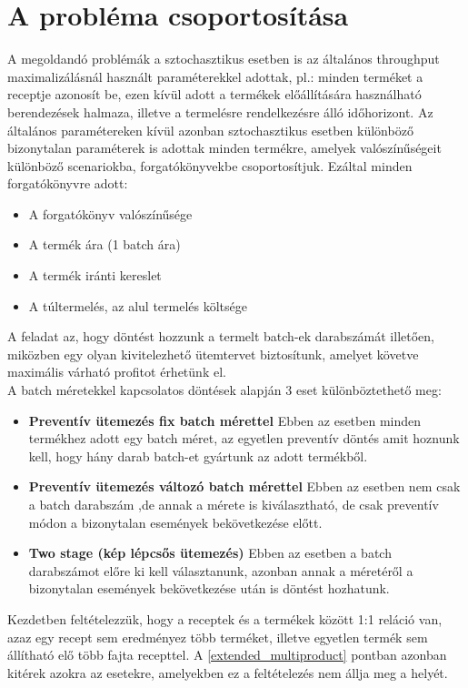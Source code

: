 \section{A probléma csoportosítása} \label{problem_csop}
A megoldandó problémák a sztochasztikus esetben is az általános throughput maximalizálásnál használt paraméterekkel adottak, pl.: minden terméket a receptje azonosít be, ezen kívül adott a termékek előállítására használható berendezések halmaza, illetve a termelésre rendelkezésre álló időhorizont. Az általános paramétereken kívül azonban sztochasztikus esetben különböző bizonytalan paraméterek is adottak minden termékre, amelyek valószínűségeit különböző scenariokba, forgatókönyvekbe csoportosítjuk. Ezáltal minden forgatókönyvre adott: 
\begin{itemize}
\item{A forgatókönyv valószínűsége}
\item{A termék ára (1 batch ára)}
\item{A termék iránti kereslet}
\item{A túltermelés, az alul termelés költsége}
\end{itemize}
A feladat az, hogy döntést hozzunk a termelt batch-ek darabszámát illetően, miközben egy olyan kivitelezhető ütemtervet biztosítunk, amelyet követve maximális várható profitot érhetünk el.\\
A batch méretekkel kapcsolatos döntések alapján 3 eset különböztethető meg:
\begin{itemize}
\item \textbf{Preventív ütemezés fix batch mérettel} Ebben az esetben minden termékhez adott egy batch méret, az egyetlen preventív döntés amit hoznunk kell, hogy hány darab batch-et gyártunk az adott termékből.
\item \textbf{Preventív ütemezés változó batch mérettel} Ebben az esetben nem csak a batch darabszám ,de annak a mérete is kiválasztható, de csak preventív módon a bizonytalan események bekövetkezése előtt.
\item \textbf{Two stage (kép lépcsős ütemezés)} Ebben az esetben a batch darabszámot előre ki kell választanunk, azonban annak a méretéről a bizonytalan események bekövetkezése után is döntést hozhatunk.
\end{itemize}
Kezdetben feltételezzük, hogy a receptek és a termékek között 1:1 reláció van, azaz egy recept sem eredményez több terméket, illetve egyetlen termék sem állítható elő több fajta recepttel. A \ref{extended_multiproduct} pontban azonban kitérek azokra az esetekre, amelyekben ez a feltételezés nem állja meg a helyét.
